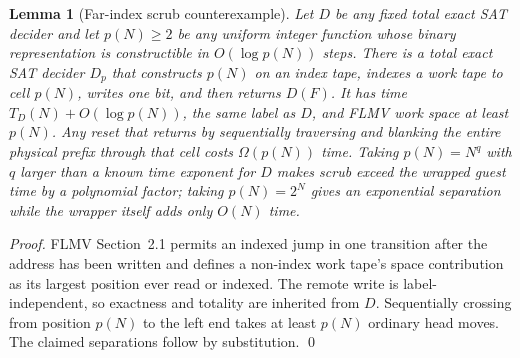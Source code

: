 \documentclass[11pt]{article}
\newtheorem{lemma}[theorem]{Lemma}
\begin{document}
\begin{lemma}[Far-index scrub counterexample]\label{lem:far}
Let $D$ be any fixed total exact SAT decider and let $p(N)\ge2$ be any uniform
integer function whose binary representation is constructible in
$O(\log p(N))$ steps.  There is a total exact SAT decider $D_p$ that constructs
$p(N)$ on an index tape, indexes a work tape to cell $p(N)$, writes one bit, and
then returns $D(F)$.  It has time
$T_D(N)+O(\log p(N))$, the same label as $D$, and FLMV work space at least
$p(N)$.  Any reset that returns by sequentially traversing and blanking the
entire physical prefix through that cell costs $\Omega(p(N))$ time.  Taking
$p(N)=N^q$ with $q$ larger than a known time exponent for $D$ makes scrub exceed
the wrapped guest time by a polynomial factor; taking $p(N)=2^N$ gives an
exponential separation while the wrapper itself adds only $O(N)$ time.
\end{lemma}
\begin{proof}
FLMV Section~2.1 permits an indexed jump in one transition after the address has
been written and defines a non-index work tape's space contribution as its
largest position ever read or indexed.  The remote write is label-independent,
so exactness and totality are inherited from $D$.  Sequentially crossing from
position $p(N)$ to the left end takes at least $p(N)$ ordinary head moves.  The
claimed separations follow by substitution. \qed
\end{proof}
\end{document}
